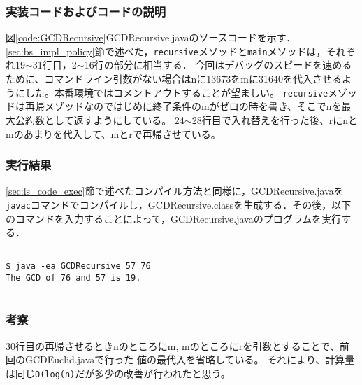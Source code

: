 \documentclass[10.5pt,a4paper]{jsarticle}
\newcommand{\figref}[1]{図\ref{#1}}
\newcommand{\secref}[1]{\ref{#1}節}
\begin{document}
\subsubsection{実装コードおよびコードの説明}

\figref{code:GCDRecursive}GCDRecursive.javaのソースコードを示す．\secref{sec:bs_impl_policy}で述べた，\texttt{recursive}メソッドと\texttt{main}メソッドは，それぞれ19$\sim$31行目，2$\sim$16行の部分に相当する．
今回はデバッグのスピードを速めるために、コマンドライン引数がない場合はnに13673をmに31640を代入させるようにした。本番環境ではコメントアウトすることが望ましい。
\texttt{recursive}メゾッドは再帰メゾッドなのではじめに終了条件のmがゼロの時を書き、そこでnを最大公約数として返すようにしている。
24$\sim$28行目で入れ替えを行った後、rにnとmのあまりを代入して、mとrで再帰させている。

\subsubsection{実行結果}

\secref{sec:ls_code_exec}で述べたコンパイル方法と同様に，GCDRecursive.javaを\texttt{javac}コマンドでコンパイルし，GCDRecursive.classを生成する．その後，以下のコマンドを入力することによって，GCDRecursive.javaのプログラムを実行する．
\begin{verbatim}
-------------------------------------
$ java -ea GCDRecursive 57 76
The GCD of 76 and 57 is 19.
-------------------------------------
\end{verbatim}

\subsubsection{考察}

30行目の再帰させるときnのところにm, mのところにrを引数とすることで、前回のGCDEuclid.javaで行った
値の最代入を省略している。
それにより、計算量は同じ\texttt{O(log(n)}だが多少の改善が行われたと思う。
\end{document}
